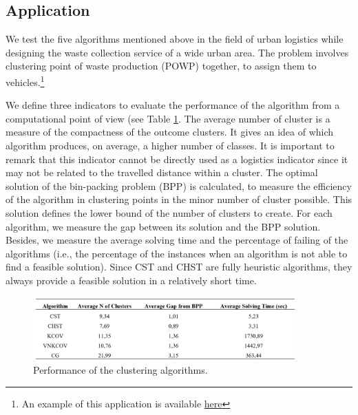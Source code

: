 \subsection{Application}
We test the five algorithms mentioned above in the field of urban logistics while designing the waste collection service of a wide urban area. The problem involves clustering point of waste production (POWP) together, to assign them to vehicles.\footnote{An example of this application is available \href{https://github.com/aletuf93/logproj/blob/master/examples/DIST_03\%20Route\%20topology\%20design.ipynb}{here}} \par

We define three indicators to evaluate the performance of the algorithm from a computational point of view (see Table \ref{tab_ROMA_application}. The average number of cluster is a measure of the compactness of the outcome clusters. It gives an idea of which algorithm produces, on average, a higher number of classes. It is important to remark that this indicator cannot be directly used as a logistics indicator since it may not be related to the travelled distance within a cluster. The optimal solution of the bin-packing problem (BPP) is calculated, to measure the efficiency of the algorithm in clustering points in the minor number of cluster possible. This solution defines the lower bound of the number of clusters to create. For each algorithm, we measure the gap between its solution and the BPP solution. Besides, we measure the average solving time and the percentage of failing of the algorithms (i.e., the percentage of the instances when an algorithm is not able to find a feasible solution). Since CST and CHST are fully heuristic algorithms, they always provide a feasible solution in a relatively short time.

\begin{figure}[hbt!]
\centering
\includegraphics[width=0.9\textwidth]{SectionDistribution/design_figures/tab_ROMA_application.png}
\captionsetup{type=table}
\caption{Performance of the clustering algorithms.}
\label{tab_ROMA_application}
\end{figure}

